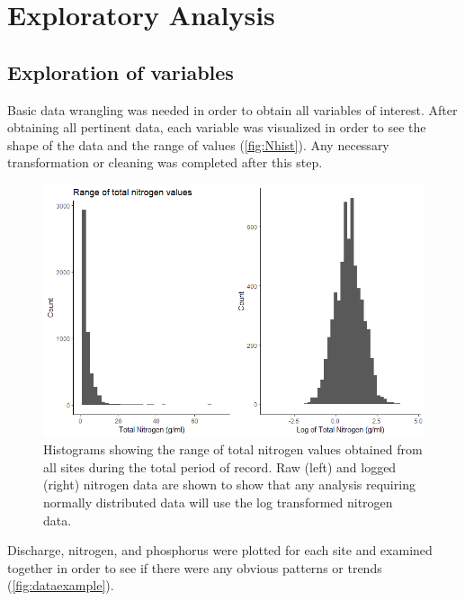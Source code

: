 \documentclass[12pt,]{article}
\makeatletter
\def\maxwidth{\ifdim\Gin@nat@width>\linewidth\linewidth\else\Gin@nat@width\fi}
\makeatother
\begin{document}
\hypertarget{exploratory-analysis}{%
\section{Exploratory Analysis}\label{exploratory-analysis}}

\hypertarget{exploration-of-variables}{%
\subsection{Exploration of variables}\label{exploration-of-variables}}

Basic data wrangling was needed in order to obtain all variables of
interest. After obtaining all pertinent data, each variable was
visualized in order to see the shape of the data and the range of values
(\autoref{fig:Nhist}). Any necessary transformation or cleaning was
completed after this step.

\begin{figure}[H]
\includegraphics[width=\maxwidth]{../Figures/Nitrogenhist} \caption{\label{fig:Nhist} Histograms showing the range of total nitrogen values obtained from all sites during the total period of record. Raw (left) and logged (right) nitrogen data are shown to show that any analysis requiring normally distributed data will use the log transformed nitrogen data.}\label{fig:Nhist}
\end{figure}

Discharge, nitrogen, and phosphorus were plotted for each site and
examined together in order to see if there were any obvious patterns or
trends (\autoref{fig:dataexample}).
\end{document}

